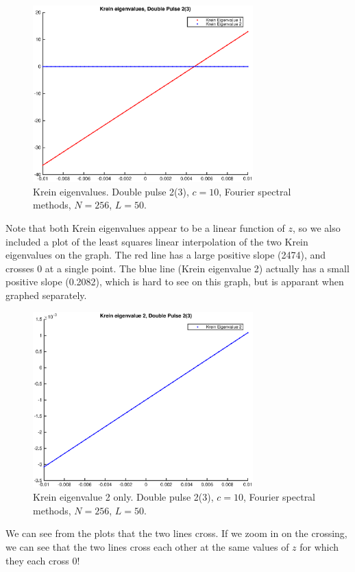 \documentclass[12pt]{article}
\begin{document}
\begin{figure}[H]
	\includegraphics[width=8.5cm]{dp2kreineig1}
	\caption{Krein eigenvalues. Double pulse 2(3), $c = 10$, Fourier spectral methods, $N = 256$, $L = 50$. }
\end{figure}

Note that both Krein eigenvalues appear to be a linear function of $z$, so we also included a plot of the least squares linear interpolation of the two Krein eigenvalues on the graph. The red line has a large positive slope (2474), and crosses 0 at a single point. The blue line (Krein eigenvalue 2) actually has a small positive slope (0.2082), which is hard to see on this graph, but is apparant when graphed separately.

\begin{figure}[H]
	\includegraphics[width=8.5cm]{dp2kreineig2}
	\caption{Krein eigenvalue 2 only. Double pulse 2(3), $c = 10$, Fourier spectral methods, $N = 256$, $L = 50$. }
\end{figure}

We can see from the plots that the two lines cross. If we zoom in on the crossing, we can see that the two lines cross each other at the same values of $z$ for which they each cross 0!
\end{document}

